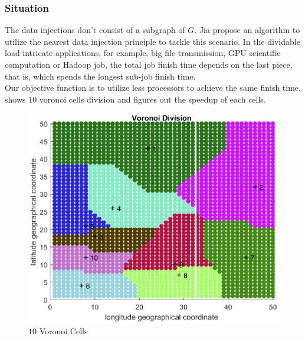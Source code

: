 \subsubsection{Situation \uppercase\expandafter{}}
The data injections don't consist of a subgraph of $G$.  
Jia \cite{fortune1995voronoi} propose an algorithm to utilize the nearest data injection principle to tackle this scenario.  In the dividable load intricate applications, for example, big file transmission, GPU scientific computation \cite{krevat2002job} or Hadoop job, the total job finish time depends on the last piece, that is, which spends the longest sub-job finish time.  \\
Our objective function is to utilize less processors to achieve the same finish time.  \\
 shows $10$ voronoi cells division and  figures out the speedup of each cells.\\
\begin{figure}[!ht]
\centering
\includegraphics[width=1\columnwidth]{figure/voronoi_even_cells.eps}
\caption{$10$ Voronoi Cells}
\label{fig:voronoi_even_cells}
\end{figure}

